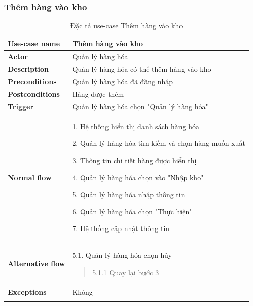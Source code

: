 \subsubsection{Thêm hàng vào kho}
{
    \setlength\extrarowheight{6pt}
    \begin{longtable}{| p{} | p{} |}
        \hline
        \textbf{Use-case name}
         &
        Thêm hàng vào kho
        \\
        \hline
        \textbf{Actor}
         &
        Quản lý hàng hóa
        \\
        \hline
        \textbf{Description}
         &
        Quản lý hàng hóa có thể thêm hàng vào kho
        \\
        \hline
        \textbf{Preconditions}
         &
        Quản lý hàng hóa đã đăng nhập
        \\
        \hline
        \textbf{Postconditions}
         &
        Hàng được thêm
        \\
        \hline
        \textbf{Trigger}
         &
        Quản lý hàng hóa chọn "Quản lý hàng hóa"
        \\
        \hline
        \begin{flushleft}
            \textbf{Normal flow}
        \end{flushleft}
         &
        1. Hệ thống hiển thị danh sách hàng hóa

        2. Quản lý hàng hóa tìm kiếm và chọn hàng muốn xuất

        3. Thông tin chi tiết hàng được hiển thị

        4. Quản lý hàng hóa chọn vào "Nhập kho"

        5. Quản lý hàng hóa nhập thông tin

        6. Quản lý hàng hóa chọn "Thực hiện"

        7. Hệ thống cập nhật thông tin
        \\
        \hline
        \begin{flushleft}
            \textbf{Alternative flow}
        \end{flushleft}
         &
        5.1. Quản lý hàng hóa chọn hủy
        \begin{quote}
            5.1.1 Quay lại bước 3
        \end{quote}
        \\
        \hline
        \textbf{Exceptions}
         &
        Không
        \\
        \hline
        \caption{Đặc tả use-case Thêm hàng vào kho}
    \end{longtable}
}


